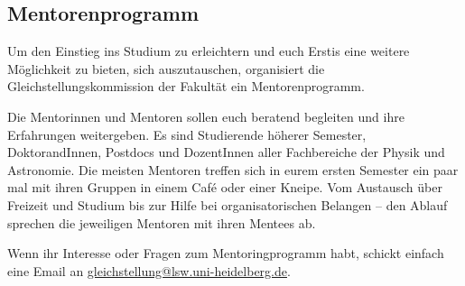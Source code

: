\subsection{Mentorenprogramm}
Um den Einstieg ins Studium zu erleichtern und euch Erstis eine weitere Möglichkeit zu bieten, sich auszutauschen, organisiert die Gleichstellungskommission der Fakultät ein Mentorenprogramm.

Die Mentorinnen und Mentoren sollen euch beratend begleiten und ihre Erfahrungen weitergeben. Es sind Studierende höherer Semester, DoktorandInnen, Postdocs und DozentInnen aller Fachbereiche der Physik und Astronomie. Die meisten Mentoren treffen sich in eurem ersten Semester ein paar mal mit ihren Gruppen in einem Café oder einer Kneipe. Vom Austausch über Freizeit und Studium bis zur Hilfe bei organisatorischen Belangen – den Ablauf sprechen die jeweiligen Mentoren mit ihren Mentees ab.

Wenn ihr Interesse oder Fragen zum Mentoringprogramm habt, schickt einfach eine Email an \url{gleichstellung@lsw.uni-heidelberg.de}. 
